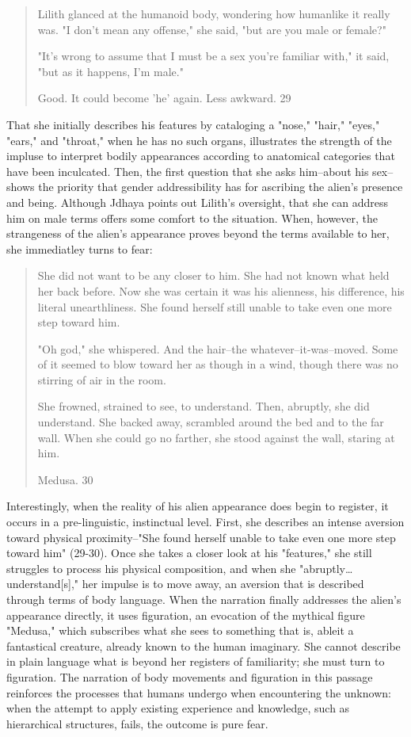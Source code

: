 \documentclass[11pt]{article}
\begin{document}
\begin{enumerate}
\begin{quote}
Lilith glanced at the humanoid body, wondering how humanlike it really
was. "I don't mean any offense," she said, "but are you male or
female?"

"It's wrong to assume that I must be a sex you're familiar with," it
said, "but as it happens, I'm male."

Good. It could become 'he' again. Less awkward. 29
\end{quote}
That she initially describes his features by cataloging a "nose,"
"hair," "eyes," "ears," and "throat," when he has no such organs,
illustrates the strength of the impluse to interpret bodily
appearances according to anatomical categories that have been
inculcated. Then, the first question that she asks him--about his
sex--shows the priority that gender addressibility has for ascribing
the alien's presence and being. Although Jdhaya points out Lilith's
oversight, that she can address him on male terms offers some comfort
to the situation. When, however, the strangeness of the alien's
appearance proves beyond the terms available to her, she immediatley
turns to fear:
\begin{quote}
She did not want to be any closer to him. She had not known what held
her back before. Now she was certain it was his alienness, his
difference, his literal unearthliness. She found herself still unable
to take even one more step toward him.

"Oh god," she whispered. And the hair--the
whatever--it-was--moved. Some of it seemed to blow toward her as
though in a wind, though there was no stirring of air in the room.

She frowned, strained to see, to understand. Then, abruptly, she did
understand. She backed away, scrambled around the bed and to the far
wall. When she could go no farther, she stood against the wall,
staring at him.

Medusa. 30
\end{quote}
Interestingly, when the reality of his alien appearance does begin to
register, it occurs in a pre-linguistic, instinctual level. First, she
describes an intense aversion toward physical proximity--"She found
herself unable to take even one more step toward him" (29-30). Once
she takes a closer look at his "features," she still struggles to
process his physical composition, and when she
"abruptly\ldots{} understand[s]," her impulse is to move away, an aversion
that is described through terms of body language. When the narration
finally addresses the alien's appearance directly, it uses figuration,
an evocation of the mythical figure "Medusa," which subscribes what
she sees to something that is, ableit a fantastical creature, already
known to the human imaginary. She cannot describe in plain language
what is beyond her registers of familiarity; she must turn to
figuration. The narration of body movements and figuration in this
passage reinforces the processes that humans undergo when encountering
the unknown: when the attempt to apply existing experience and
knowledge, such as hierarchical structures, fails, the outcome is
pure fear.


\end{enumerate}
\end{document}
